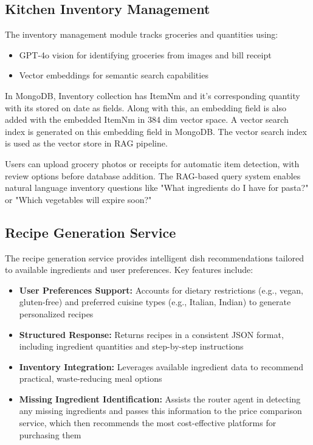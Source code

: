 \documentclass{ecai}
\begin{document}
\subsection{Kitchen Inventory Management}

The inventory management module tracks groceries and quantities using:
\begin{itemize}[noitemsep,topsep=0pt]
    \item GPT-4o vision for identifying groceries from images and bill receipt
    \item Vector embeddings for semantic search capabilities
\end{itemize}

In MongoDB, Inventory collection has ItemNm and it’s corresponding quantity with its stored on date as fields. Along with this, an embedding field is also added with the embedded ItemNm in 384 dim vector space. A vector search index is generated on this embedding field in MongoDB. The vector search index is used as the vector store in RAG pipeline.

Users can upload grocery photos or receipts for automatic item detection, with review options before database addition. The RAG-based query system enables natural language inventory questions like "What ingredients do I have for pasta?" or "Which vegetables will expire soon?"

\subsection{Recipe Generation Service}

The recipe generation service provides intelligent dish recommendations tailored to available ingredients and user preferences. Key features include:

\begin{itemize}[noitemsep,topsep=0pt]
    \item \textbf{User Preferences Support:} Accounts for dietary restrictions (e.g., vegan, gluten-free) and preferred cuisine types (e.g., Italian, Indian) to generate personalized recipes
    \item \textbf{Structured Response:} Returns recipes in a consistent JSON format, including ingredient quantities and step-by-step instructions
    \item \textbf{Inventory Integration:} Leverages available ingredient data to recommend practical, waste-reducing meal options
    \item \textbf{Missing Ingredient Identification:} Assists the router agent in detecting any missing ingredients and passes this information to the price comparison service, which then recommends the most cost-effective platforms for purchasing them
\end{itemize}
\end{document}
